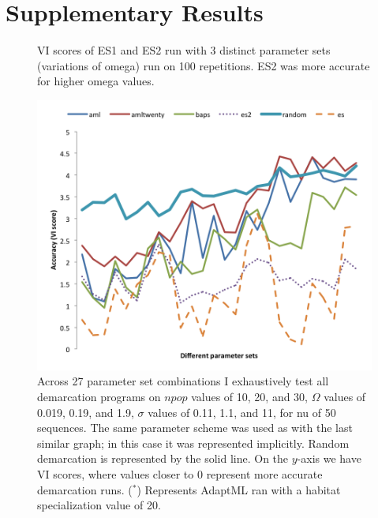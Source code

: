 \chapter{Supplementary Results}
\begin{figure}[h!]
\centering
\noindent{}
\caption[Output file of ES1, ES2 comparison query.]{VI scores of ES1 and ES2 run with 3 distinct parameter sets (variations of omega) run on 100 repetitions. ES2 was more accurate for higher omega values.}
\label{fig:HundredResultsFile}
\end{figure}


\begin{figure}[h!]
  \centering
    \includegraphics[scale=0.75]{images/ResultGraphs/ResultGraphs-3}
      \caption[All demarcation graphical accuracy visualization on $nu = 50$.]{Across 27 parameter set combinations I exhaustively test all demarcation programs on $npop$ values of 10, 20, and 30, $\Omega$ values of 0.019, 0.19, and 1.9, $\sigma$ values of 0.11, 1.1, and 11, for nu of 50 sequences. The same parameter scheme was used as with the last similar graph; in this case it was represented implicitly. Random demarcation is represented by the solid line. On the $y$-axis we have VI scores, where values closer to 0 represent more accurate demarcation runs.  ($^\ast$) Represents AdaptML ran with a habitat specialization value of 20.}
    \label{fig:All50}
\end{figure}

